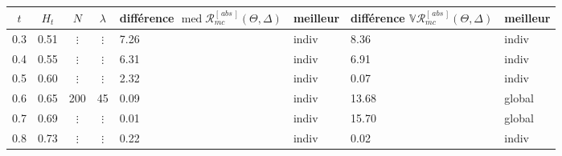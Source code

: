 \begin{table}[H]
    \centering
    \begin{tabularx}{\textwidth}{ccccXXXX}
        \toprule
    $t$ & $H_t$ & $N$      & $\lambda$ & différence $\operatorname{med} \mathcal R^{[\,abs\,]}_{mc}(\Theta, \Delta)$ & \textbf{meilleur} & différence  $\mathds V \mathcal R^{[\,abs\,]}_{mc}(\Theta, \Delta)$ & \textbf{meilleur} \\
        \midrule
    
        0.3 & 0.51  & $\vdots$ & $\vdots$  & 7.26                                                       & indiv             & 8.36                                               & indiv             \\
        0.4 & 0.55  & $\vdots$ & $\vdots$  & 6.31                                                       & indiv             & 6.91                                               & indiv             \\
        0.5 & 0.60  & $\vdots$ & $\vdots$  & 2.32                                                       & indiv             & 0.07                                               & indiv             \\
        0.6 & 0.65  & 200      & 45        & 0.09                                                       & indiv             & 13.68                                              & global            \\
        0.7 & 0.69  & $\vdots$ & $\vdots$  & 0.01                                                       & indiv             & 15.70                                              & global            \\
        0.8 & 0.73  & $\vdots$ & $\vdots$  & 0.22                                                       & indiv             & 0.02                                               & indiv             \\
    
        \midrule
    

\end{tabularx}
\end{table}
